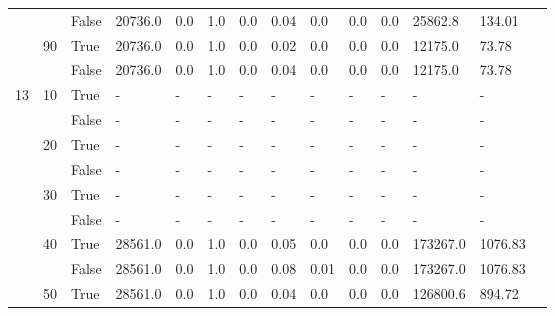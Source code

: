 \documentclass{article}
\begin{document}
\begin{landscape}
\begin{small}
\begin{longtable}[c]{@{}lll|ll|ll|ll|ll|lll@{}}
   &    & False & 20736.0         & 0.0            & 1.0           & 0.0           & 0.04          & 0.0           & 0.0           & 0.0           & 25862.8       & 134.01      &  \\
   & 90 & True  & 20736.0         & 0.0            & 1.0           & 0.0           & 0.02          & 0.0           & 0.0           & 0.0           & 12175.0       & 73.78       &  \\
   &    & False & 20736.0         & 0.0            & 1.0           & 0.0           & 0.04          & 0.0           & 0.0           & 0.0           & 12175.0       & 73.78       &  \\
  \midrule
13 & 10 & True  & -               & -              & -             & -             & -             & -             & -             & -             & -             & -           &  \\
   &    & False & -               & -              & -             & -             & -             & -             & -             & -             & -             & -           &  \\
   & 20 & True  & -               & -              & -             & -             & -             & -             & -             & -             & -             & -           &  \\
   &    & False & -               & -              & -             & -             & -             & -             & -             & -             & -             & -           &  \\
   & 30 & True  & -               & -              & -             & -             & -             & -             & -             & -             & -             & -           &  \\
   &    & False & -               & -              & -             & -             & -             & -             & -             & -             & -             & -           &  \\
   & 40 & True  & 28561.0         & 0.0            & 1.0           & 0.0           & 0.05          & 0.0           & 0.0           & 0.0           & 173267.0      & 1076.83     &  \\
   &    & False & 28561.0         & 0.0            & 1.0           & 0.0           & 0.08          & 0.01          & 0.0           & 0.0           & 173267.0      & 1076.83     &  \\
   & 50 & True  & 28561.0         & 0.0            & 1.0           & 0.0           & 0.04          & 0.0           & 0.0           & 0.0           & 126800.6      & 894.72      &  \\

\end{longtable}
\end{small}
\end{landscape}
\end{document}
